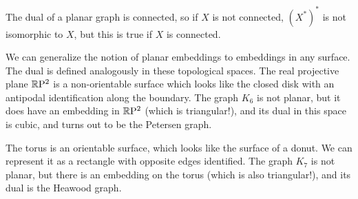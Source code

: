 The dual of a planar graph is connected, so if $X$ is not connected, $(X^*)^*$ is not isomorphic to $X$, but this is true if $X$ is connected.

We can generalize the notion of planar embeddings to embeddings in any surface.  The  dual is defined analogously in these topological spaces.  The real projective plane $\mathbb{R}\mathrm{P}^2$ is a non-orientable surface which looks like the closed disk with an antipodal identification along the boundary.  The graph $K_6$ is not planar, but it does have an embedding in $\mathbb{R}\mathrm{P}^2$ (which is triangular!), and its dual in this space is cubic, and turns out to be the Petersen graph.

The torus is an orientable surface, which looks like the surface of a donut.  We can represent it as a rectangle with opposite edges identified.  The graph $K_7$ is not planar, but there is an embedding on the torus (which is also triangular!), and its dual is the Heawood graph.


\ifdraft

\fi
